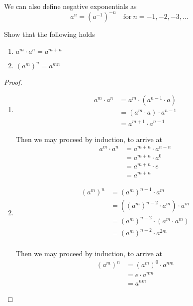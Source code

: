 \documentclass{article}
\begin{document}
We can also define negative exponentials as
\[
    a^n = (a^{-1})^{-n} \quad \text{for} \ n = -1, -2, -3, \ldots
\]

\begin{ex} Show that the following holds
    \begin{enumerate}
        \item $a^{m} \cdot a^{n} = a^{m + n}$
        \item $(a^{m})^{n} = a^{mn}$
    \end{enumerate}
\end{ex}
\begin{proof}\leavevmode
    \begin{enumerate}
        \item
        \begin{align*}
            a^m \cdot a^n &= a^m \cdot (a^{n-1} \cdot a) \tag{by definition} \\
            &= (a^m \cdot a) \cdot a^{n-1} \tag{associativity} \\
            &= a^{m+1} \cdot a^{n-1}
        \end{align*}

        Then we may proceed by induction, to arrive at
        \begin{align*}
            a^m \cdot a^n &= a^{m+n} \cdot a^{n-n} \\
            &= a^{m+n} \cdot a^0 \\
            &= a^{m+n} \cdot e \tag{by definition}\\
            &= a^{m+n} \tag{identity}
        \end{align*}
        
        \item
        \begin{align*}
            (a^m)^n &= (a^m)^{n-1} \cdot a^m \tag{by definition} \\
            &= ((a^m)^{n-2} \cdot a^m) \cdot a^m \\
            &= (a^m)^{n-2} \cdot (a^m \cdot a^m) \tag{associativity} \\
            &= (a^m)^{n-2} \cdot a^{2m} \tag{i} \\
        \end{align*}

        Then we may proceed by induction, to arrive at
        \begin{align*}
            (a^m)^n &= (a^m)^{0} \cdot a^{nm} \\
            &= e \cdot a^{nm} \tag{by definition} \\
            &= a^{nm} \tag{identity}
        \end{align*}
    \end{enumerate}
\end{proof}
\end{document}
